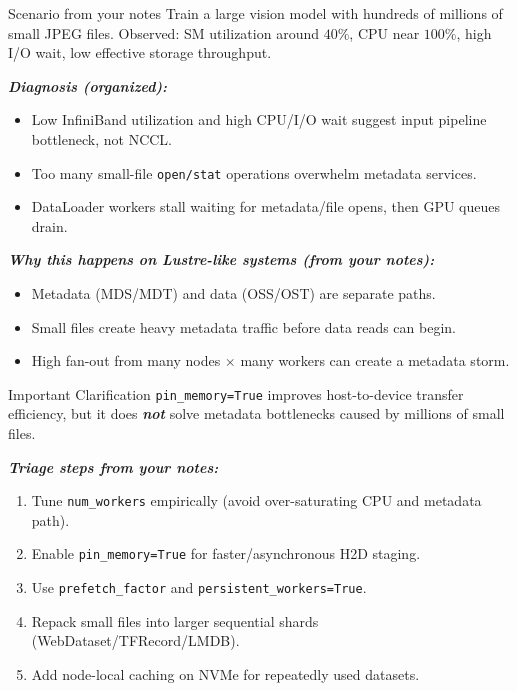 \documentclass[12pt]{article}
\let\origtextbf\textbf
\renewcommand{\textbf}[1]{\origtextbf{\textit{#1}}}
\begin{document}
\begin{greenbox}{Scenario from your notes}
Train a large vision model with hundreds of millions of small JPEG files.  
Observed: SM utilization around \(40\%\), CPU near \(100\%\), high I/O wait, low effective storage throughput.
\end{greenbox}

\textbf{Diagnosis (organized):}
\begin{itemize}
\item Low InfiniBand utilization and high CPU/I/O wait suggest input pipeline bottleneck, not NCCL.
\item Too many small-file \texttt{open/stat} operations overwhelm metadata services.
\item DataLoader workers stall waiting for metadata/file opens, then GPU queues drain.
\end{itemize}

\textbf{Why this happens on Lustre-like systems (from your notes):}
\begin{itemize}
\item Metadata (MDS/MDT) and data (OSS/OST) are separate paths.
\item Small files create heavy metadata traffic before data reads can begin.
\item High fan-out from many nodes \(\times\) many workers can create a metadata storm.
\end{itemize}

\begin{redbox}{Important Clarification}
\texttt{pin\_memory=True} improves host-to-device transfer efficiency, but it does \textbf{not} solve metadata bottlenecks caused by millions of small files.
\end{redbox}

\textbf{Triage steps from your notes:}
\begin{enumerate}[leftmargin=1.3em]
\item Tune \texttt{num\_workers} empirically (avoid over-saturating CPU and metadata path).
\item Enable \texttt{pin\_memory=True} for faster/asynchronous H2D staging.
\item Use \texttt{prefetch\_factor} and \texttt{persistent\_workers=True}.
\item Repack small files into larger sequential shards (WebDataset/TFRecord/LMDB).
\item Add node-local caching on NVMe for repeatedly used datasets.
\end{enumerate}
\end{document}
